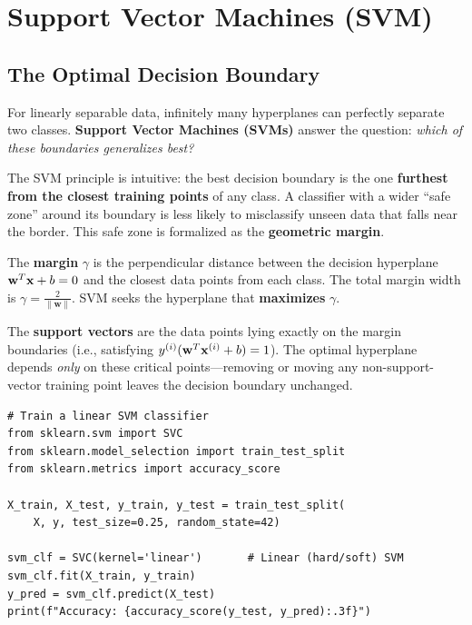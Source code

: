 \chapter*{Support Vector Machines (SVM)}

\section*{The Optimal Decision Boundary}

For linearly separable data, infinitely many hyperplanes can perfectly separate two classes. \textbf{Support Vector Machines (SVMs)} answer the question: \textit{which of these boundaries generalizes best?}

The SVM principle is intuitive: the best decision boundary is the one \textbf{furthest from the closest training points} of any class. A classifier with a wider ``safe zone'' around its boundary is less likely to misclassify unseen data that falls near the border. This safe zone is formalized as the \textbf{geometric margin}.

\begin{definition}
The \textbf{margin} $\gamma$ is the perpendicular distance between the decision hyperplane $\mathbf{w}^T\mathbf{x} + b = 0$ and the closest data points from each class. The total margin width is $\gamma = \frac{2}{\|\mathbf{w}\|}$. SVM seeks the hyperplane that \textbf{maximizes} $\gamma$.
\end{definition}

\begin{definition}
The \textbf{support vectors} are the data points lying exactly on the margin boundaries (i.e., satisfying $y^{(i)}(\mathbf{w}^T\mathbf{x}^{(i)} + b) = 1$). The optimal hyperplane depends \textit{only} on these critical points---removing or moving any non-support-vector training point leaves the decision boundary unchanged.
\end{definition}

\begin{lstlisting}[style=pythonstyle]
# Train a linear SVM classifier
from sklearn.svm import SVC
from sklearn.model_selection import train_test_split
from sklearn.metrics import accuracy_score

X_train, X_test, y_train, y_test = train_test_split(
    X, y, test_size=0.25, random_state=42)

svm_clf = SVC(kernel='linear')       # Linear (hard/soft) SVM
svm_clf.fit(X_train, y_train)
y_pred = svm_clf.predict(X_test)
print(f"Accuracy: {accuracy_score(y_test, y_pred):.3f}")
\end{lstlisting}

